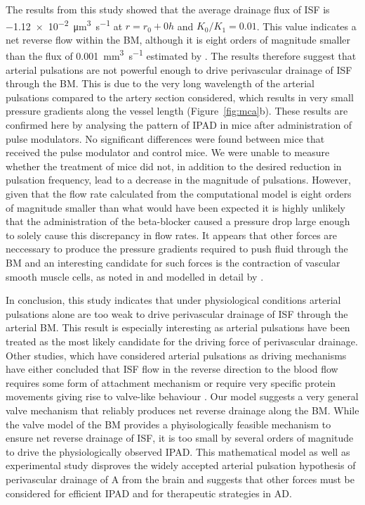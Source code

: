 \documentclass{frontiersFPHY} %
\newcommand{\Ab}{A\textbeta\xspace}
\begin{document}
The results from this study showed that the average drainage flux of ISF is \SI{-1.12e-2}{\cubic\micro\metre\per\second} at $r = r_0 + 0h$ and $K_0/K_1 = 0.01$. This value indicates a net reverse flow within the BM, although it is eight orders of magnitude smaller than the flux of \SI{0.001}{\cubic\milli\metre\per\second} estimated by \cite{Arbel-Ornath2013}. The results therefore suggest that arterial pulsations are not powerful enough to drive perivascular drainage of ISF through the BM. This is due to the very long wavelength of the arterial pulsations compared to the artery section considered, which results in very small pressure gradients along the vessel length (Figure~\ref{fig:mca}b). These results are confirmed here by analysing the pattern of IPAD in mice after administration of pulse modulators. No significant differences were found between mice that received the pulse modulator and control mice. We were unable to measure whether the treatment of mice did not, in addition to the desired reduction in pulsation frequency, lead to a decrease in the magnitude of pulsations. However, given that the flow rate calculated from the computational model is eight orders of magnitude smaller than what would have been expected it is highly unlikely that the administration of the beta-blocker caused a pressure drop large enough to solely cause this discrepancy in flow rates. It appears that other forces are neccessary to produce the pressure gradients required to push fluid through the BM and an interesting candidate for such forces is the contraction of vascular smooth muscle cells, as noted in \cite{DiMarco2015} and modelled in detail by \cite{Aldea2016}.

In conclusion, this study indicates that under physiological conditions arterial pulsations alone are too weak to drive perivascular drainage of ISF through the arterial BM. This result is especially interesting as arterial pulsations have been treated as the most likely candidate for the driving force of perivascular drainage. Other studies, which have considered arterial pulsations as driving mechanisms have either concluded that ISF flow in the reverse direction to the blood flow requires some form of attachment mechanism \cite{Schley2006,Wang2011} or require very specific protein movements giving rise to valve-like behaviour \cite{Sharp2015}. Our model suggests a very general valve mechanism that reliably produces net reverse drainage along the BM. While the valve model of the BM provides a phyisologically feasible mechanism to ensure net reverse drainage of ISF, it is too small by several orders of magnitude to drive the physiologically observed IPAD. This mathematical model as well as experimental study disproves the widely accepted arterial pulsation hypothesis of perivascular drainage of \Ab from the brain \cite{Weller2009,Carare2008,Hawkes2011,Morris2014,Schley2006,Attems2011,Wang2011,Iliff2012,Asgari2015,Sharp2015,Weller2015a} and suggests that other forces must be considered for efficient IPAD and for therapeutic strategies in AD.
\end{document}
